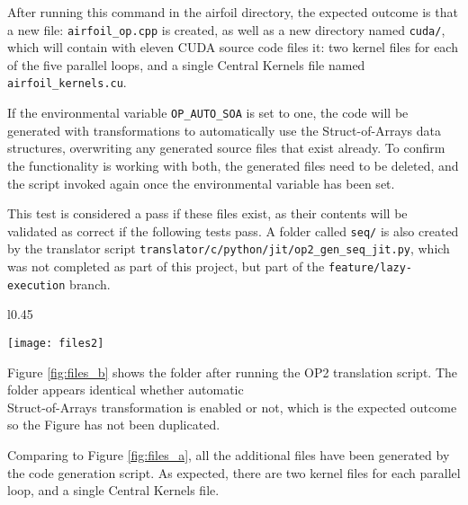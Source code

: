 \noindent After running this command in the airfoil directory, the expected outcome is that a new file: \verb|airfoil_op.cpp| is created, as well as a new directory named \verb|cuda/|, which will contain with eleven CUDA source code files it: two kernel files for each of the five parallel loops, and a single Central Kernels file named \verb|airfoil_kernels.cu|.
\par
If the environmental variable \verb|OP_AUTO_SOA| is set to one, the code will be generated with transformations to automatically use the Struct-of-Arrays data structures, overwriting any generated source files that exist already. To confirm the functionality is working with both, the generated files need to be deleted, and the script invoked again once the environmental variable has been set.
\par
This test is considered a pass if these files exist, as their contents will be validated as correct if the following tests pass. A folder called \verb|seq/| is also created by the translator script \verb|translator/c/python/jit/op2_gen_seq_jit.py|, which was not completed as part of this project, but part of the \verb|feature/lazy-execution| branch.
\begin{wrapfigure}[13]{l}{0.45\textwidth}
\caption{\textit{airfoil} folder after Code Generation}
\label{fig:files_b}
\texttt{[image: files2]}
\end{wrapfigure}
\par
Figure \ref{fig:files_b} shows the folder after running the OP2 translation script. The folder appears identical whether automatic\\ Struct-of-Arrays transformation is enabled or not, which is the expected outcome so the Figure has not been duplicated.\par
Comparing to Figure \ref{fig:files_a}, all the additional files have been generated by the code generation script. As expected, there are two kernel files for each parallel loop, and a single Central Kernels file.
\par


